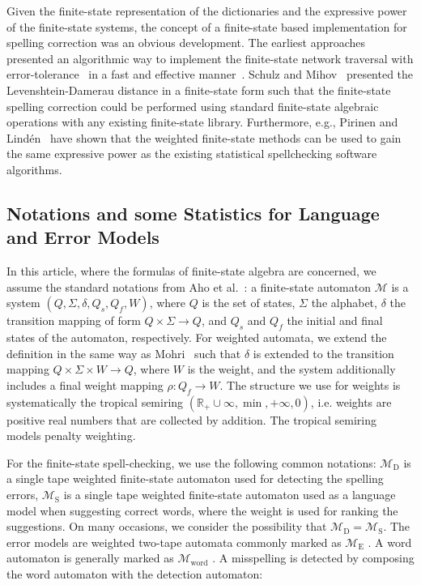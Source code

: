 \documentclass[postprint]{flammie}
\begin{document}
Given the finite-state representation of the dictionaries and the expressive
power of the finite-state systems, the concept of a finite-state based
implementation for spelling correction was an obvious development. The earliest
approaches presented an algorithmic way to implement the finite-state network
traversal with error-tolerance~\cite{oflazer1996errortolerant} in a fast and
effective manner~\cite{hulden2009fast,savary2002typographical}. Schulz
and Mihov~\cite{schulz2002fast} presented the Levenshtein-Damerau distance in a
finite-state form such that the finite-state spelling correction could be
performed using standard finite-state algebraic operations with any existing
finite-state library. Furthermore, e.g., Pirinen and
Lindén~\cite{pirinen2010creating} have shown that the weighted finite-state
methods can be used to gain the same expressive power as the existing
statistical spellchecking software algorithms.

\subsection{Notations and some Statistics for Language and Error Models}

In this article, where the formulas of finite-state algebra are concerned, we
assume the standard notations from Aho et al.~\cite{aho2007compilers}: a
finite-state automaton $\mathcal{M}$ is a system $(Q, \Sigma, \delta, Q_s, Q_f,
W)$, where $Q$ is the set of states, $\Sigma$ the alphabet, $\delta$ the
transition mapping of form $Q \times \Sigma \rightarrow Q$, and $Q_s$ and $Q_f$
the initial and final states of the automaton, respectively. For weighted
automata, we extend the definition in the same way as
Mohri~\cite{mohri2009weighted} such that $\delta$ is extended to the transition
mapping $Q × \Sigma × W \rightarrow Q$, where $W$ is the weight, and the system
additionally includes a final weight mapping $\rho: Q_f \rightarrow W$. The
structure we use for weights is systematically the tropical semiring
$(\mathbb{R}_+ \cup \infty, \min, +\infty, 0)$, i.e. weights are positive real
numbers that are collected by addition. The tropical semiring models penalty
weighting.

For the finite-state spell-checking, we use the following common notations:
$\mathcal{M}_\mathrm{D}$ is
a single tape weighted finite-state automaton used for detecting the spelling errors, $\mathcal{M}_\mathrm{S}$
is a single tape weighted finite-state automaton used as a language model when
suggesting correct words, where the weight is used for ranking the suggestions. On
many occasions, we consider the possibility that
$\mathcal{M}_\mathrm{D} = \mathcal{M}_\mathrm{S}$. The error models are
weighted two-tape automata commonly marked as $\mathcal{M}_\mathrm{E}$
. A word automaton is generally marked as $\mathcal{M}_\mathrm{word}$
. A misspelling is detected by composing the word automaton
with the detection automaton:
\end{document}
